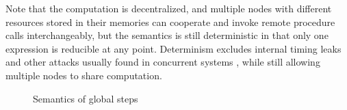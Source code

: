 
Note that the computation is decentralized, and multiple nodes with different resources stored in their memories can cooperate and invoke remote procedure calls interchangeably, but the semantics is still deterministic in that only one expression is reducible at any point. Determinism excludes internal timing leaks and other attacks usually found in concurrent systems \cite{Smith:1998:SIF:268946.268975, Muller:2012:TPS:2384616.2384621}, while still allowing multiple nodes to share computation.

\begin{figure}
\centering
{}
\caption{Semantics of global steps}
\label{fig:global-steps}
\end{figure}

